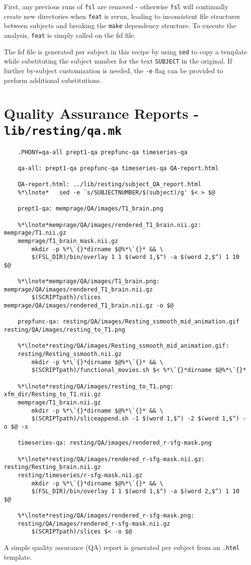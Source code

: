 First, any previous runs of \texttt{fsl} are removed - otherwise \texttt{fsl} will continually create new directories when \texttt{feat} is rerun, leading to inconsistent file structures between subjects and breaking the \texttt{make} dependency structure. To execute the analysis, \texttt{feat} is simply called on the fsf file. 

The fsf file is generated per subject in this recipe by using \texttt{sed} to copy a template while substituting the subject number for the text \texttt{SUBJECT} in the original. If further by-subject customization is needed, the \texttt{-e} flag can be provided to perform additional substitutions.

\section{Quality Assurance Reports - \texttt{lib/resting/qa.mk}}
\begin{lstlisting}
	.PHONY=qa-all prept1-qa prepfunc-qa timeseries-qa
	
	qa-all: prept1-qa prepfunc-qa timeseries-qa QA-report.html
	
	QA-report.html: ../lib/resting/subject_QA_report.html
	%*\lnote*	sed -e `s/SUBJECTNUMBER/$(subject)/g' $< > $@
	
	prept1-qa: memprage/QA/images/T1_brain.png
	
	%*\lnote*memprage/QA/images/rendered_T1_brain.nii.gz: memprage/T1.nii.gz 
	memprage/T1_brain_mask.nii.gz
		mkdir -p %*\`{}*dirname $@%*\`{}* && \
		$(FSL_DIR)/bin/overlay 1 1 $(word 1,$^) -a $(word 2,$^) 1 10 $@
	
	%*\lnote*memprage/QA/images/T1_brain.png: memprage/QA/images/rendered_T1_brain.nii.gz
		$(SCRIPTpath)/slices memprage/QA/images/rendered_T1_brain.nii.gz -o $@

	prepfunc-qa: resting/QA/images/Resting_ssmooth_mid_animation.gif resting/QA/images/resting_to_T1.png
	
	%*\lnote*resting/QA/images/Resting_ssmooth_mid_animation.gif: 
	resting/Resting_ssmooth.nii.gz
		mkdir -p %*\`{}*dirname $@%*\`{}* && \
		$(SCRIPTpath)/functional_movies.sh $< %*\`{}*dirname $@%*\`{}*
	
	%*\lnote*resting/QA/images/resting_to_T1.png: xfm_dir/Resting_to_T1.nii.gz 
	memprage/T1_brain.nii.gz
		mkdir -p %*\`{}*dirname $@%*\`{}* && \
		$(SCRIPTpath)/sliceappend.sh -1 $(word 1,$^) -2 $(word 1,$^) -o $@ -s
	
	timeseries-qa: resting/QA/images/rendered_r-sfg-mask.png
	
	%*\lnote*resting/QA/images/rendered_r-sfg-mask.nii.gz: resting/Resting_brain.nii.gz 
	resting/timeseries/r-sfg-mask.nii.gz
		mkdir -p %*\`{}*dirname $@%*\`{}* && \
		$(FSL_DIR)/bin/overlay 1 1 $(word 1,$^) -a $(word 2,$^) 1 10 $@
	
	%*\lnote*resting/QA/images/rendered_r-sfg-mask.png: 
	resting/QA/images/rendered_r-sfg-mask.nii.gz
		$(SCRIPTpath)/slices $< -o $@
\end{lstlisting}
A simple quality assurance (QA) report is generated per subject from an \texttt{.html} template.

